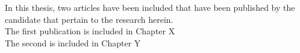 \singlespacing
\begin{declarationlong}
In this thesis, two articles have been included that have been published by the candidate that pertain to the research herein. \\

The first publication is included in Chapter X \\

The second is included in Chapter Y \\
\end{declarationlong}